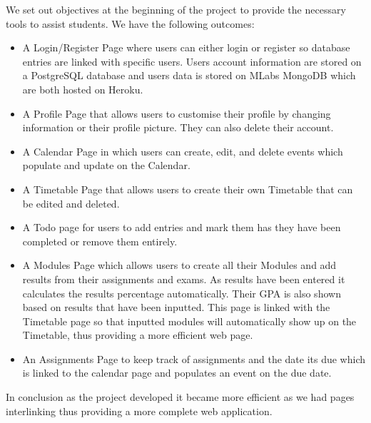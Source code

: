 We set out objectives at the beginning of the project to provide the necessary tools to assist students. We have the following outcomes:
\begin{itemize}
\item A Login/Register Page where users can either login or register so database entries are linked with specific users. Users account information are stored on a PostgreSQL database and users data is stored on MLabs MongoDB which are both hosted on Heroku.

\item A Profile Page that allows users to customise their profile by changing information or their profile picture. They can also delete their account.

\item A Calendar Page in which users can create, edit, and delete events which populate and update on the Calendar.

\item A Timetable Page that allows users to create their own Timetable that can be edited and deleted.

\item A Todo page for users to add entries and mark them has they have been completed or remove them entirely. 

\item A Modules Page which allows users to create all their Modules and add results from their assignments and exams. As results have been entered it calculates the results percentage automatically. Their GPA is also shown based on results that have been inputted. This page is linked with the Timetable page so that inputted modules will automatically show up on the Timetable, thus providing a more efficient web page. 
\item An Assignments Page to keep track of assignments and the date its due which is linked to the calendar page and populates an event on the due date.
\end{itemize}

In conclusion as the project developed it became more efficient as we had pages interlinking thus providing a more complete web application. 

